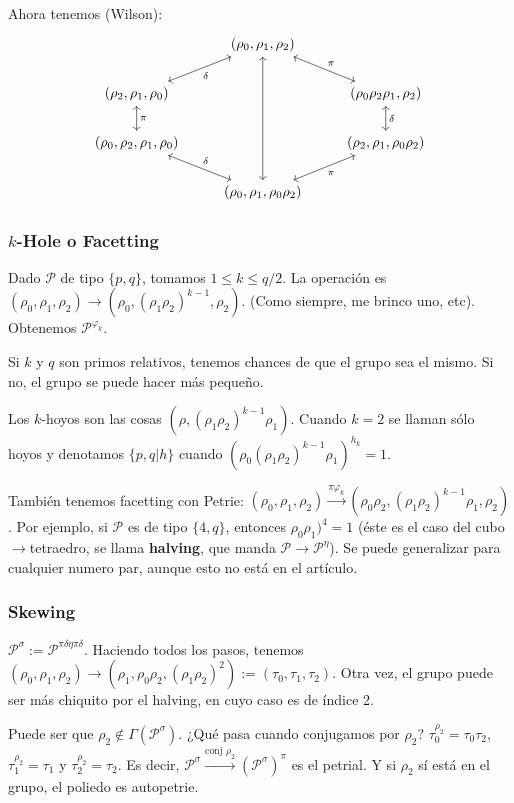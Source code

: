 \documentclass[spanish]{article}
\theoremstyle{definition}
\newcommand{\p}{\mathcal{P}}
\begin{document}
Ahora tenemos (Wilson):
\[\begin{tikzcd}
	&(\rho_0,\rho_1,\rho_2)\arrow[dl,leftrightarrow,"\delta"]\arrow[rd,leftrightarrow,"\pi"]\\
	(\rho_2,\rho_1,\rho_0)\arrow[d,leftrightarrow,"\pi"]&&(\rho_0\rho_2\rho_1,\rho_2)\arrow[d,leftrightarrow,"\delta"]\\
	(\rho_0,\rho_2,\rho_1,\rho_0)\arrow[dr,leftrightarrow,"\delta"]&&(\rho_2,\rho_1,\rho_0\rho_2)\arrow[dl,leftrightarrow,"\pi"]\\
	&(\rho_0,\rho_1,\rho_0\rho_2)\arrow[uuu,leftrightarrow]
\end{tikzcd}\]
\subsubsection{$k$-Hole o Facetting}
Dado $\p$ de tipo $\{p,q\}$, tomamos $1\leq k\leq q/2$. La operación es $(\rho_0,\rho_1,\rho_2)\to(\rho_0,(\rho_1\rho_2)^{k-1},\rho_2)$. (Como siempre, me brinco uno, etc). Obtenemos $\p^{\varphi_k}$.

Si $k$ y $q$ son primos relativos, tenemos chances de que el grupo sea el mismo. Si no, el grupo se puede hacer más pequeño.

Los $k$-hoyos son las cosas $(\rho,(\rho_1\rho_2)^{k-1}\rho_1)$. Cuando $k=2$ se llaman sólo hoyos y denotamos $\{p,q|h\}$ cuando $(\rho_0(\rho_1\rho_2)^{k-1}\rho_1)^{h_k}=1$.

También tenemos facetting con Petrie: $(\rho_0,\rho_1,\rho_2)\xrightarrow{\pi\varphi_k}(\rho_0\rho_2,(\rho_1\rho_2)^{k-1}\rho_1,\rho_2)$. Por ejemplo, si $\p$ es de tipo $\{4,q\}$, entonces $\rho_0\rho_1)^4=1$ (éste es el caso del cubo$\to$tetraedro, se llama \textbf{halving}, que manda $\p\to\p^\eta$). Se puede generalizar para cualquier numero par, aunque esto no está en el artículo.

\subsubsection{Skewing}
$\p^\sigma:=\p^{\pi\delta\eta\pi\delta}$. Haciendo todos los pasos, tenemos $(\rho_0,\rho_1,\rho_2)\to(\rho_1,\rho_0\rho_2,(\rho_1\rho_2)^2):=(\tau_0,\tau_1,\tau_2)$. Otra vez, el grupo puede ser más chiquito por el halving, en cuyo caso es de índice 2.

Puede ser que $\rho_2\notin\Gamma(\p^\sigma)$. ¿Qué pasa cuando conjugamos por $\rho_2$? $\tau_0^{\rho_2}=\tau_0\tau_2$, $\tau_1^{\rho_2}=\tau_1$ y $\tau_2^{\rho_2}=\tau_2$. Es decir, $\p^\sigma\xrightarrow{\text{conj }\rho_2}(\p^\sigma)^\pi$ es el petrial. Y si $\rho_2$ sí está en el grupo, el poliedo es autopetrie.
\end{document}
